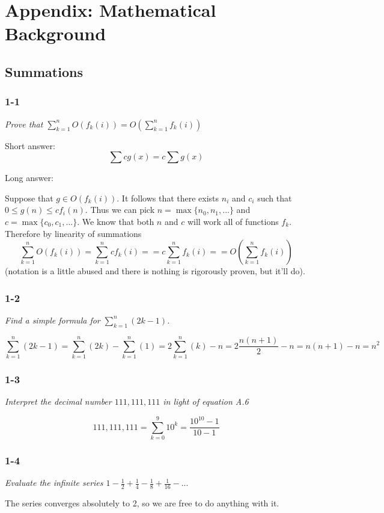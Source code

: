 \documentclass[11pt,oneside,titlepage]{book}
\begin{document}
\part{Appendix: Mathematical Background}
\chapter{Summations}

\section*{1-1}
\textit{Prove that $\sum_{k  = 1}^n{O(f_k(i))} = O(\sum_{k  = 1}^n{f_k(i)})$}

Short answer:
$$\sum cg(x) = c\sum{g(x)}$$

Long answer:

Suppose that $g \in O(f_k(i))$. It follows that there exists $n_i$ and $c_i$
such that $0 \leq g(n) \leq cf_i(n)$. Thus we can pick
$n = \max\{n_0, n_1, ...\}$ and $c = \max\{c_0, c_1, ... \}$. We know that
both $n$ and $c$ will work all of functions $f_k$. Therefore by
linearity of summations
$$\sum_{k  = 1}^n{O(f_k(i))}
= \sum_{k  = 1}^n{cf_k(i)} =
= c\sum_{k  = 1}^n{f_k(i)} = 
= O(\sum_{k  = 1}^n{f_k(i)})$$
(notation is a little abused and there is nothing is rigorously
proven, but it'll do).

\section*{1-2}
\textit{Find a simple formula for $\sum_{k = 1}^n{(2k - 1)}$.}

$$\sum_{k = 1}^n{(2k - 1)} =
\sum_{k = 1}^n{(2k)} - \sum_{k = 1}^n{(1)} =
2\sum_{k = 1}^n{(k)} - n =
2\frac{n(n + 1)}{2} - n =
n(n + 1) - n =
n^2
$$


\section*{1-3}
\textit{Interpret the decimal number $111,111,111$ in light of equation A.6}

$$111,111,111 = \sum_{k = 0}^{9}{10^k} = \frac{10^{10} - 1}{10 - 1}$$

\section*{1-4}
\textit{Evaluate the infinite series $1 - \frac 1 2 + \frac 1 4 - \frac 1 8
  + \frac{1}{16} - ...$}

The series converges absolutely to 2, so we are free to do anything with it.
\end{document}

